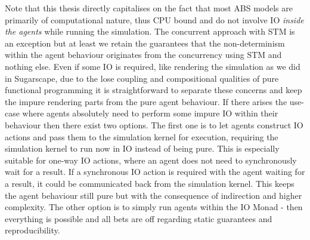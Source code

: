 Note that this thesis directly capitalises on the fact that most ABS models are primarily of computational nature, thus CPU bound and do not involve IO \textit{inside the agents} while running the simulation. The concurrent approach with STM is an exception but at least we retain the guarantees that the non-determinism within the agent behaviour originates from the concurrency using STM and nothing else. Even if some IO is required, like rendering the simulation as we did in Sugarscape, due to the lose coupling and compositional qualities of pure functional programming it is straightforward to separate these concerns and keep the impure rendering parts from the pure agent behaviour. If there arises the use-case where agents absolutely need to perform some impure IO within their behaviour then there exist two options. The first one is to let agents construct IO actions and pass them to the simulation kernel for execution, requiring the simulation kernel to run now in IO instead of being pure. This is especially suitable for one-way IO actions, where an agent does not need to synchronously wait for a result. If a synchronous IO action is required with the agent waiting for a result, it could be communicated back from the simulation kernel. This keeps the agent behaviour still pure but with the consequence of indirection and higher complexity. The other option is to simply run agents within the IO Monad - then everything is possible and all bets are off regarding static guarantees and reproducibility.

%
%
%	
%	

